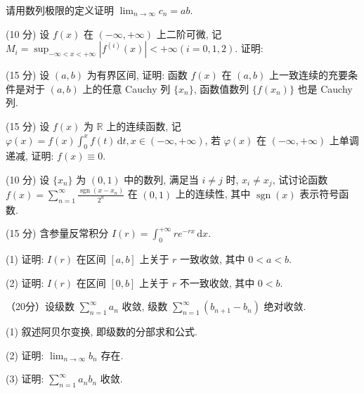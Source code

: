 \nopagebreak[4]
请用数列极限的定义证明 $\lim_{n\to \infty}c_n = ab.$\par
\par{}
\par{}
(10 分) 设 $f(x)$ 在 $(- \infty, + \infty)$ 上二阶可微, 记 $M_{i} = \sup_{-\infty < x < + \infty}|f^{(i)}(x)| < + \infty (i = 0,1,2)$. 证明:\par
\nopagebreak[4]
\par{}
(15 分) 设 $(a, b)$ 为有界区间, 证明: 函数 $f(x)$ 在 $(a, b)$ 上一致连续的充要条件是对于 $(a, b)$ 上的任意 Cauchy 列 $\{x_{n}\}$, 函数值数列 $\{f(x_{n})\}$ 也是 Cauchy 列.\par
\par{}
(15 分) 设 $f(x)$ 为 $\mathbb{R}$ 上的连续函数, 记 $\varphi(x) = f(x) \int_{0}^{x} f(t) \, \mathrm{d}t, x \in (-\infty, +\infty)$, 若 $\varphi(x)$ 在 $(-\infty, +\infty)$ 上单调递减, 证明: $f(x) \equiv 0$.\par
\par{}
(10 分) 设 $\{x_{n}\}$ 为 $(0,1)$ 中的数列, 满足当 $i \neq j$ 时, $x_{i} \neq x_{j}$, 试讨论函数 $f(x) = \sum_{n=1}^{\infty} \frac{\operatorname{sgn}(x - x_{n})}{2^{n}}$ 在 $(0,1)$ 上的连续性, 其中 $\operatorname{sgn}(x)$ 表示符号函数.\par
\par{}
(15 分) 含参量反常积分 $I(r) = \int_{0}^{+\infty} r e^{-rx} \, \mathrm{d}x$.\par
(1) 证明: $I(r)$ 在区间 $[a, b]$ 上关于 $r$ 一致收敛, 其中 $0 < a < b$.\par
(2) 证明: $I(r)$ 在区间 $[0, b]$ 上关于 $r$ 不一致收敛, 其中 $0 < b$.\par
\par{}
（20分）设级数 $\sum_{n=1}^{\infty} a_n$ 收敛, 级数 $\sum_{n=1}^{\infty} (b_{n+1} - b_n)$ 绝对收敛.\par
(1) 叙述阿贝尔变换, 即级数的分部求和公式.\par
(2) 证明: $\lim_{n\to \infty}b_n$ 存在.\par
(3) 证明: $\sum_{n=1}^{\infty} a_n b_n$ 收敛.\par
